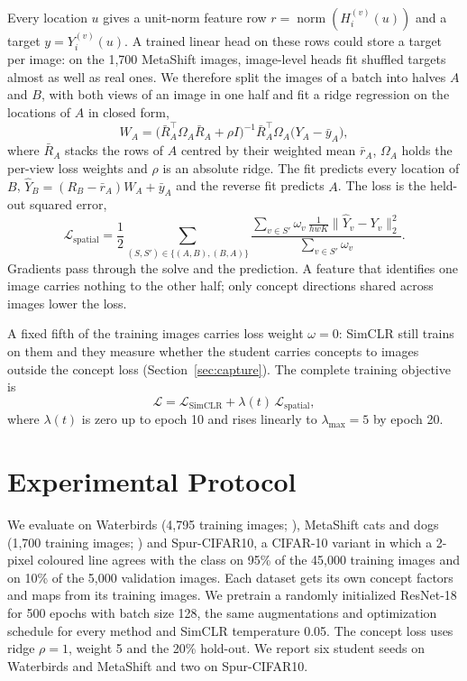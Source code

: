 \documentclass{article}
\begin{document}
Every location $u$ gives a unit-norm feature row $r=\operatorname{norm}(H_i^{(v)}(u))$ and a target $y=Y_i^{(v)}(u)$. A trained linear head on these rows could store a target per image: on the 1,700 MetaShift images, image-level heads fit shuffled targets almost as well as real ones. We therefore split the images of a batch into halves $A$ and $B$, with both views of an image in one half and fit a ridge regression on the locations of $A$ in closed form,
\begin{equation}
 W_A=\big(\bar R_A^\top\Omega_A\bar R_A+\rho I\big)^{-1}\bar R_A^\top\Omega_A\big(Y_A-\bar y_A\big),
\end{equation}
where $\bar R_A$ stacks the rows of $A$ centred by their weighted mean $\bar r_A$, $\Omega_A$ holds the per-view loss weights and $\rho$ is an absolute ridge. The fit predicts every location of $B$, $\hat Y_B=(R_B-\bar r_A)W_A+\bar y_A$ and the reverse fit predicts $A$. The loss is the held-out squared error,
\begin{equation}
 \mathcal{L}_{\mathrm{spatial}}=\frac{1}{2}\sum_{(S,S')\in\{(A,B),(B,A)\}}
 \frac{\sum_{v\in S'}\omega_v\,\frac{1}{hwK}\big\lVert\hat Y_v-Y_v\big\rVert_2^2}{\sum_{v\in S'}\omega_v}.
\end{equation}
Gradients pass through the solve and the prediction. A feature that identifies one image carries nothing to the other half; only concept directions shared across images lower the loss.

A fixed fifth of the training images carries loss weight $\omega=0$: SimCLR still trains on them and they measure whether the student carries concepts to images outside the concept loss (Section~\ref{sec:capture}). The complete training objective is
\begin{equation}
\mathcal{L} = \mathcal{L}_{\mathrm{SimCLR}} + \lambda(t)\,\mathcal{L}_{\mathrm{spatial}},
\end{equation}
where $\lambda(t)$ is zero up to epoch 10 and rises linearly to $\lambda_{\max}=5$ by epoch 20.

\section{Experimental Protocol}
We evaluate on Waterbirds (4,795 training images; \citealp{sagawa2020groupdro}), MetaShift cats and dogs (1,700 training images; \citealp{liang2022metashift}) and Spur-CIFAR10, a CIFAR-10 variant \citep{krizhevsky2009cifar} in which a 2-pixel coloured line agrees with the class on 95\% of the 45,000 training images and on 10\% of the 5,000 validation images. Each dataset gets its own concept factors and maps from its training images. We pretrain a randomly initialized ResNet-18 \citep{he2016resnet} for 500 epochs with batch size 128, the same augmentations and optimization schedule for every method and SimCLR temperature 0.05. The concept loss uses ridge $\rho=1$, weight 5 and the 20\% hold-out. We report six student seeds on Waterbirds and MetaShift and two on Spur-CIFAR10.
\end{document}
